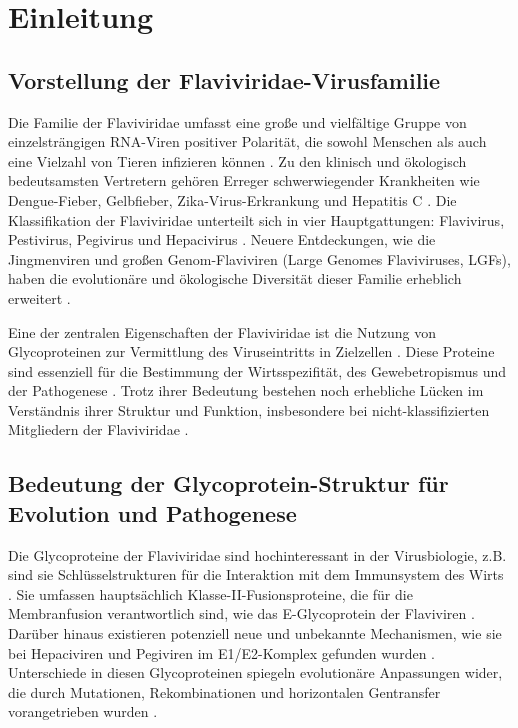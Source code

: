 \chapter{Einleitung} \label{chap:einleitung}

\section{Vorstellung der Flaviviridae-Virusfamilie}
\label{sec:vorstellung-der-flaviviridae-virusfamilie}

Die Familie der Flaviviridae umfasst eine große und vielfältige Gruppe von einzelsträngigen RNA-Viren positiver Polarität, die sowohl Menschen als auch eine Vielzahl von Tieren infizieren können \autocite{Simmonds2017}. Zu den klinisch und ökologisch bedeutsamsten Vertretern gehören Erreger schwerwiegender Krankheiten wie Dengue-Fieber, Gelbfieber, Zika-Virus-Erkrankung und Hepatitis C \autocite{Mackenzie2004}. Die Klassifikation der Flaviviridae unterteilt sich in vier Hauptgattungen: Flavivirus, Pestivirus, Pegivirus und Hepacivirus \autocite{Simmonds2017}. Neuere Entdeckungen, wie die Jingmenviren und großen Genom-Flaviviren (Large Genomes Flaviviruses, LGFs), haben die evolutionäre und ökologische Diversität dieser Familie erheblich erweitert \autocite{shiDivergentVirusesDiscovered2015}.

Eine der zentralen Eigenschaften der Flaviviridae ist die Nutzung von Glycoproteinen zur Vermittlung des Viruseintritts in Zielzellen \autocite{Mukhopadhyay2005}. Diese Proteine sind essenziell für die Bestimmung der Wirtsspezifität, des Gewebetropismus und der Pathogenese \autocite{Rey1995}. Trotz ihrer Bedeutung bestehen noch erhebliche Lücken im Verständnis ihrer Struktur und Funktion, insbesondere bei nicht-klassifizierten Mitgliedern der Flaviviridae \autocite{mifsudMappingGlycoproteinStructure2024}.

\section{Bedeutung der Glycoprotein-Struktur für Evolution und Pathogenese}
\label{sec:bedeutung-der-glycoprotein-struktur-fuer-evolution-und-pathogenese}

Die Glycoproteine der Flaviviridae sind hochinteressant in der Virusbiologie, z.B. sind sie Schlüsselstrukturen für die Interaktion mit dem Immunsystem des Wirts \autocite{Heinz2012}. Sie umfassen hauptsächlich Klasse-II-Fusionsproteine, die für die Membranfusion verantwortlich sind, wie das E-Glycoprotein der Flaviviren \autocite{kuhnStructureDengueVirus2002}. Darüber hinaus existieren potenziell neue und unbekannte Mechanismen, wie sie bei Hepaciviren und Pegiviren im E1/E2-Komplex gefunden wurden \autocite{Lavie2017}. Unterschiede in diesen Glycoproteinen spiegeln evolutionäre Anpassungen wider, die durch Mutationen, Rekombinationen und horizontalen Gentransfer vorangetrieben wurden \autocite{Weaver2009}.

